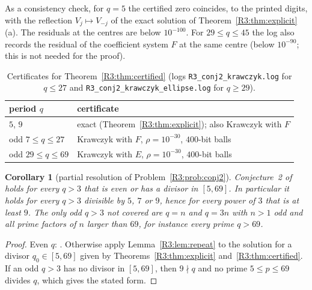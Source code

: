 \documentclass[11pt]{amsart}
\newtheorem{corollary}[theorem]{Corollary}
\theoremstyle{definition}
\theoremstyle{remark}
\begin{document}
As a consistency check, for $q=5$ the certified zero coincides, to the printed
digits, with the reflection $V_j\mapsto V_{-j}$ of the exact solution of
Theorem~\ref{R3:thm:explicit}(a). The residuals at the centres are below
$10^{-100}$. For $29\le q\le45$ the log also records the residual of the coefficient
system $F$ at the same centre (below $10^{-90}$; this is not needed for the proof).

\begin{table}[ht]
\centering\small
\begin{tabular}{ll}
\hline
period $q$ & certificate\\
\hline
$5$, $9$ & exact (Theorem~\ref{R3:thm:explicit}); also Krawczyk with $F$\\
odd $7\le q\le27$ & Krawczyk with $F$, $\rho=10^{-30}$, $400$-bit balls\\
odd $29\le q\le69$ & Krawczyk with $E$, $\rho=10^{-30}$, $400$-bit balls\\
\hline
\end{tabular}
\caption{Certificates for Theorem~\ref{R3:thm:certified}
(logs \texttt{R3\_\allowbreak{}conj2\_\allowbreak{}krawczyk.log} for $q\le27$ and
\texttt{R3\_\allowbreak{}conj2\_\allowbreak{}krawczyk\_\allowbreak{}ellipse.log} for $q\ge29$).}
\label{R3:tab:cert}
\end{table}

\begin{corollary}[partial resolution of Problem~\ref{R3:prob:conj2}]\label{R3:cor:conj2}
Conjecture~2 of~\cite{R3-FFORS} holds for every $q>3$ that is even or has a divisor
in $[5,69]$. In particular it holds for every $q>3$ divisible by $5$, $7$ or
$9$, hence for every power of $3$ that is at least $9$. The only odd $q>3$ not
covered are $q=n$ and $q=3n$ with $n>1$ odd and all prime factors of $n$ larger
than $69$, for instance every prime $q>69$.
\end{corollary}

\begin{proof}
Even $q$: \cite{R3-FFORS}. Otherwise apply Lemma~\ref{R3:lem:repeat} to the
solution for a divisor $q_0\in[5,69]$ given by Theorems~\ref{R3:thm:explicit}
and~\ref{R3:thm:certified}. If an odd $q>3$ has no divisor in $[5,69]$, then
$9\nmid q$ and no prime $5\le p\le69$ divides $q$, which gives the stated form.
\end{proof}
\end{document}
